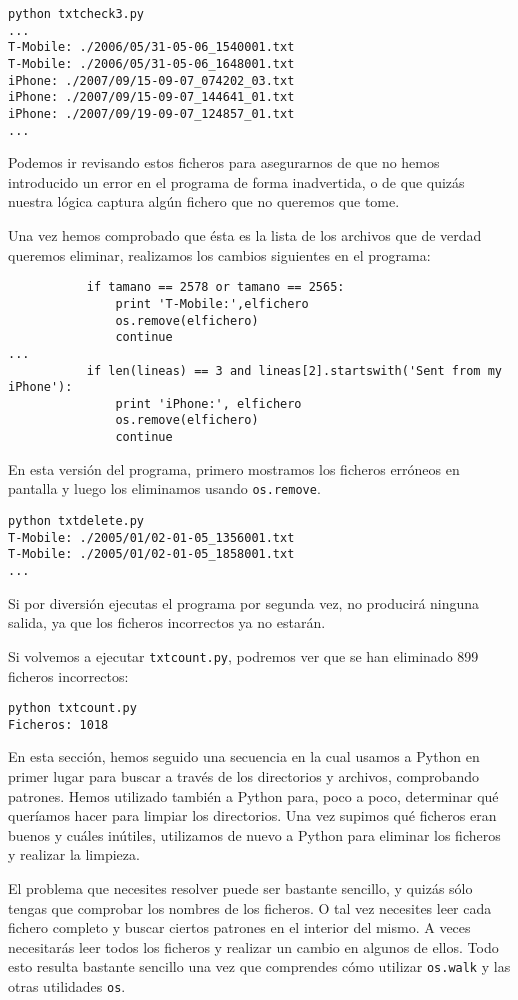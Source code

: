 \beforeverb
\begin{verbatim}
python txtcheck3.py
...
T-Mobile: ./2006/05/31-05-06_1540001.txt
T-Mobile: ./2006/05/31-05-06_1648001.txt
iPhone: ./2007/09/15-09-07_074202_03.txt
iPhone: ./2007/09/15-09-07_144641_01.txt
iPhone: ./2007/09/19-09-07_124857_01.txt
...
\end{verbatim}
\afterverb
%
Podemos ir revisando estos ficheros para asegurarnos de que no hemos
introducido un error en el programa de forma inadvertida, o de que quizás
nuestra lógica captura algún fichero que no queremos que tome.

Una vez hemos comprobado que ésta es la lista de los archivos que de verdad queremos eliminar,
realizamos los cambios siguientes en el programa:

\beforeverb
\begin{verbatim}
           if tamano == 2578 or tamano == 2565:
               print 'T-Mobile:',elfichero
               os.remove(elfichero)
               continue
...
           if len(lineas) == 3 and lineas[2].startswith('Sent from my iPhone'):
               print 'iPhone:', elfichero
               os.remove(elfichero)
               continue
\end{verbatim}
\afterverb
%
En esta versión del programa, primero mostramos los ficheros erróneos
en pantalla y luego los eliminamos
usando {\tt os.remove}.

\beforeverb
\begin{verbatim}
python txtdelete.py 
T-Mobile: ./2005/01/02-01-05_1356001.txt
T-Mobile: ./2005/01/02-01-05_1858001.txt
...
\end{verbatim}
\afterverb
%
Si por diversión ejecutas el programa por segunda vez, no producirá ninguna salida,
ya que los ficheros incorrectos ya no estarán.

Si volvemos a ejecutar {\tt txtcount.py}, podremos ver que se han eliminado
899 ficheros incorrectos:
\beforeverb
\begin{verbatim}
python txtcount.py 
Ficheros: 1018
\end{verbatim}
\afterverb
%
En esta sección, hemos seguido una secuencia en la cual usamos a
Python en primer lugar para buscar a través de los directorios y archivos, comprobando
patrones. Hemos utilizado también a Python para, poco a poco, determinar qué queríamos
hacer para limpiar los directorios. Una vez supimos
qué ficheros eran buenos y cuáles inútiles, utilizamos de nuevo a Python
para eliminar los ficheros y realizar la limpieza.

El problema que necesites resolver puede ser bastante sencillo,
y quizás sólo tengas que comprobar los nombres de los ficheros.
O tal vez necesites leer cada fichero completo y buscar ciertos patrones en el
interior del mismo. A veces necesitarás
leer todos los ficheros y realizar un cambio en
algunos de ellos. Todo esto resulta bastante
sencillo una vez que comprendes cómo utilizar {\tt os.walk}
y las otras utilidades {\tt os}.

